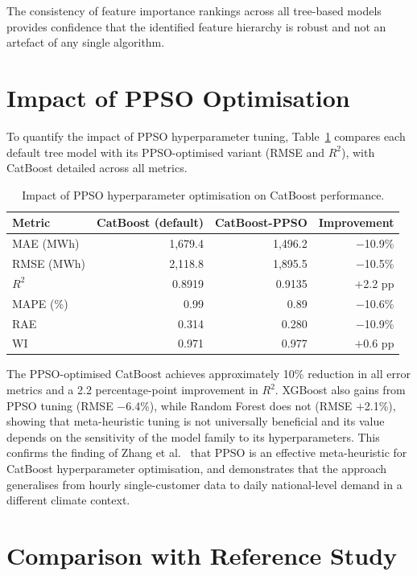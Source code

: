 The consistency of feature importance rankings across all tree-based models provides confidence that the identified feature hierarchy is robust and not an artefact of any single algorithm.


\section{Impact of PPSO Optimisation}

To quantify the impact of PPSO hyperparameter tuning, Table~\ref{tab:ppso_impact} compares each default tree model with its PPSO-optimised variant (RMSE and $R^2$), with CatBoost detailed across all metrics.

\begin{table}[H]
\centering
\caption{Impact of PPSO hyperparameter optimisation on CatBoost performance.}
\label{tab:ppso_impact}
\begin{tabular}{@{}lrrr@{}}
\toprule
\textbf{Metric} & \textbf{CatBoost (default)} & \textbf{CatBoost-PPSO} & \textbf{Improvement} \\
\midrule
MAE (MWh) & 1{,}679.4 & 1{,}496.2 & $-$10.9\% \\
RMSE (MWh) & 2{,}118.8 & 1{,}895.5 & $-$10.5\% \\
$R^2$ & 0.8919 & 0.9135 & $+$2.2 pp \\
MAPE (\%) & 0.99 & 0.89 & $-$10.6\% \\
RAE & 0.314 & 0.280 & $-$10.9\% \\
WI & 0.971 & 0.977 & $+$0.6 pp \\
\bottomrule
\end{tabular}
\end{table}

The PPSO-optimised CatBoost achieves approximately 10\% reduction in all error metrics and a 2.2 percentage-point improvement in $R^2$. XGBoost also gains from PPSO tuning (RMSE $-$6.4\%), while Random Forest does not (RMSE $+$2.1\%), showing that meta-heuristic tuning is not universally beneficial and its value depends on the sensitivity of the model family to its hyperparameters. This confirms the finding of Zhang et al.\ \parencite{zhang2023catboostppso} that PPSO is an effective meta-heuristic for CatBoost hyperparameter optimisation, and demonstrates that the approach generalises from hourly single-customer data to daily national-level demand in a different climate context.


\section{Comparison with Reference Study}

